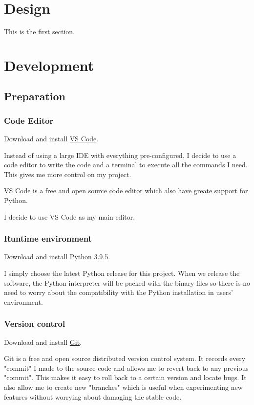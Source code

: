 \documentclass{report}
\begin{document}
\chapter{Design}

This is the first section.

\chapter{Development}

\section{Preparation}

\subsection{Code Editor}

Download and install \href{https://code.visualstudio.com/}{VS Code}.

Instead of using a large IDE with everything pre-configured, I decide to use a code editor to write the code and a terminal to execute all the commands I need. This gives me more control on my project.

VS Code is a free and open source code editor which also have greate support for Python.

I decide to use VS Code as my main editor.

\subsection{Runtime environment}

Download and install \href{https://www.python.org/downloads/}{Python 3.9.5}.

I simply choose the latest Python release for this project. When we release the software, the Python interpreter will be packed with the binary files so there is no need to worry about the compatibility with the Python installation in users' environment.

\subsection{Version control}

Download and install \href{https://git-scm.com/}{Git}.

Git is a free and open source distributed version control system. It records every "commit" I made to the source code and allows me to revert back to any previous "commit". This makes it easy to roll back to a certain version and locate bugs. It also allow me to create new "branches" which is useful when experimenting new features without worrying about damaging the stable code.
\end{document}
